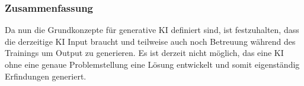 \subsubsection{Zusammenfassung}
Da nun die Grundkonzepte für generative KI definiert sind, ist festzuhalten,
dass die derzeitige KI Input braucht und teilweise auch noch Betreuung während 
des Trainings um Output zu generieren. Es ist derzeit nicht möglich, 
das eine KI ohne eine genaue Problemstellung eine Lösung entwickelt und somit
eigenständig Erfindungen generiert. 
\newpage

